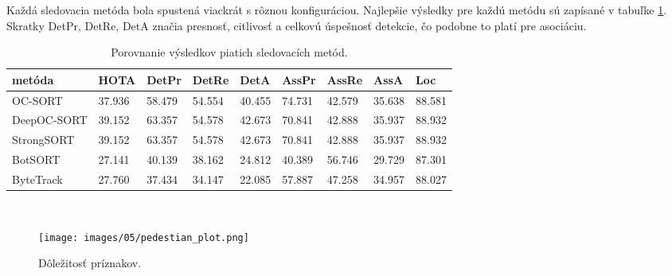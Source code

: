 Každá sledovacia metóda bola spustená viackrát s rôznou konfiguráciou. Najlepšie výsledky pre každú metódu sú zapísané v tabuľke \ref{table:hota1}. Skratky DetPr, DetRe, DetA značia presnosť, citlivosť a celkovú úspešnosť detekcie, čo podobne to platí pre asociáciu.

\begin{table}[ht]
\centering
\begin{tabular}{|l l l l l l l l l|}
 \hline
metóda & HOTA & DetPr & DetRe & DetA & AssPr & AssRe & AssA & Loc \\ [0.5ex]
 \hline
OC-SORT & 37.936 & 58.479 & 54.554 & 40.455 & 74.731 & 42.579 & 35.638 & 88.581 \\ [0.1ex]
DeepOC-SORT & 39.152 & 63.357 & 54.578 & 42.673 & 70.841 & 42.888 & 35.937 & 88.932 \\ [0.1ex]
StrongSORT & 39.152 & 63.357 & 54.578 & 42.673 & 70.841 & 42.888 & 35.937 & 88.932 \\ [0.1ex]
BotSORT & 27.141 & 40.139 & 38.162 & 24.812 & 40.389 & 56.746 & 29.729 & 87.301 \\ [0.1ex]
ByteTrack & 27.760 & 37.434 & 34.147 & 22.085 & 57.887 & 47.258 & 34.957 & 88.027 \\ [0.1ex]
 \hline
\end{tabular}
\caption{Porovnanie výsledkov piatich sledovacích metód.}
\label{table:hota1}
\end{table}
\\

\begin{figure}[ht]
    \centering
    \texttt{[image: images/05/pedestian\_plot.png]}
    \caption{Dôležitosť príznakov.}
    \label{img:road}
\end{figure}

